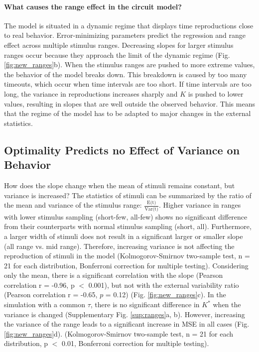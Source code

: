 \documentclass[10pt, a4paper]{article}
\begin{document}
\paragraph{What causes the range effect in the circuit model?} 
The model is situated in a dynamic regime that displays time reproductions close to real behavior.
Error-minimizing parameters predict the regression and range effect across multiple stimulus ranges.
Decreasing slopes for larger stimulus ranges occur because they approach the limit of the dynamic regime (Fig. \ref{fig:new_ranges}b).
When the stimulus ranges are pushed to more extreme values, the behavior of the model breaks down. 
This breakdown is caused by too many timeouts, which occur when time intervals are too short. If time intervals are too long, the variance in reproductions increases sharply and $K$ is pushed to lower values, resulting in slopes that are well outside the observed behavior. 
This means that the regime of the model has to be adapted to major changes in the external statistics. 

\subsection{Optimality Predicts no Effect of Variance on Behavior}
How does the slope change when the mean of stimuli remains constant, but variance is increased?
The statistics of stimuli can be summarized by the ratio of the mean and variance of the stimulus range: $\frac{\text{E(t)}}{\text{Var(t)}}$.
Higher variance in ranges with lower stimulus sampling (short-few, all-few) shows no significant difference from their counterparts with normal stimulus sampling (short, all).
Furthermore, a larger width of stimuli does not result in a significant larger or smaller slope (all range vs. mid range).
Therefore, increasing variance is not affecting the reproduction of stimuli in the model (Kolmogorov-Smirnov two-sample test, n = 21 for each distribution, Bonferroni correction for multiple testing).
Considering only the mean, there is a significant correlation with the slope (Pearson correlation r = -0.96, p $<$ 0.001), but not with the external variability ratio (Pearson correlation r = -0.65, $p$ = 0.12) (Fig. \ref{fig:new_ranges}c).
In the simulation with a common $\tau$, there is no significant difference in $K^*$ when the variance is changed (Supplementary Fig. \ref{sup:ranges}a, b).
However, increasing the variance of the range leads to a significant increase in MSE in all cases (Fig. \ref{fig:new_ranges}d).  
(Kolmogorov-Smirnov two-sample test, n = 21 for each distribution, p $<$ 0.01, Bonferroni correction for multiple testing).
\end{document}
